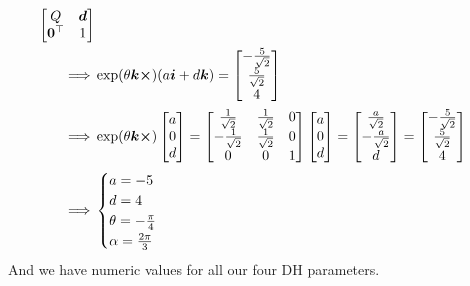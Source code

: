 \documentclass[a4paper]{scrartcl}
\begin{document}
\begin{equation}
\begin{aligned}
\begin{bmatrix}
            Q & \bm{d} \\ \bm{0}^\top & 1
        \end{bmatrix}\\
        \implies & \exp(\theta \bm{k}\cross)(a \bm{i} + d \bm{k}) = \begin{bmatrix}
            -\frac{5}{\sqrt{2}} \\ \frac{5}{\sqrt{2}} \\ 4
        \end{bmatrix}\\
        \implies &  \exp(\theta \bm{k}\cross) \begin{bmatrix}
            a \\ 0 \\ d
        \end{bmatrix} = 
        \begin{bmatrix}
            \frac{1}{\sqrt{2}} & \frac{1}{\sqrt{2}} & 0 \\
            -\frac{1}{\sqrt{2}} & \frac{1}{\sqrt{2}} & 0 \\
            0 & 0 & 1
        \end{bmatrix}
        \begin{bmatrix}
            a \\ 0 \\ d
        \end{bmatrix} = 
        \begin{bmatrix}
            \frac{a}{\sqrt{2}} \\ -\frac{a}{\sqrt{2}} \\ d
        \end{bmatrix} = 
        \begin{bmatrix}
            -\frac{5}{\sqrt{2}} \\ \frac{5}{\sqrt{2}} \\ 4
        \end{bmatrix}\\
        \implies & \begin{cases}
            a = -5\\
            d = 4\\
            \theta = -\tfrac{\pi}{4}\\
            \alpha =  \frac{2\pi}{3}
        \end{cases} 
    \end{aligned}
\end{equation}
And we have numeric values for all our four DH parameters.
\end{document}
